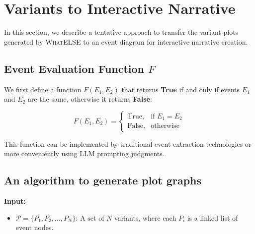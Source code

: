


\section{Variants to Interactive Narrative}
\label{variants_to_graph}


In this section, we describe a tentative approach to transfer the variant plots generated by \textsc{WhatELSE} to an event diagram for interactive narrative creation.

\subsection{Event Evaluation Function \( F \)}

We first define a function \( F(E_1, E_2) \) that returns \textbf{True} if and only if events \( E_1 \) and \( E_2 \) are the same, otherwise it returns \textbf{False}:

\[
F(E_1, E_2) =
\begin{cases}
\text{True}, & \text{if } E_1 = E_2 \\
\text{False}, & \text{otherwise}
\end{cases}
\]

This function can be implemented by traditional event extraction technologies or more conveniently using LLM prompting judgments.

\subsection{An algorithm to generate plot graphs}

\textbf{Input:}
\begin{itemize}
    \item \( \mathcal{P} = \{P_1, P_2, \dots, P_N\} \): A set of \( N \) variants, where each \( P_i \) is a linked list of event nodes.
\end{itemize}

